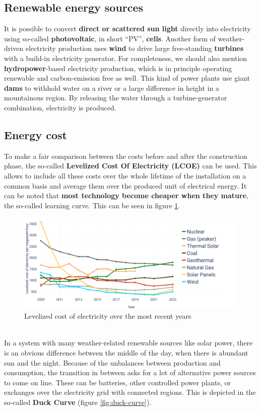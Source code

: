 \documentclass[../summary.tex]{subfiles}
\begin{document}
	\subsection{Renewable energy sources}
	
	It is possible to convert \textbf{direct or scattered sun light} directly into electricity using so-called \textbf{photovoltaic}, in short “PV”, \textbf{cells}. Another form of weather-driven electricity production uses \textbf{wind} to drive large free-standing \textbf{turbines} with a build-in electricity generator. For completeness, we should also mention \textbf{hydropower}-based electricity production, which is in principle operating renewable and carbon-emission free as well. This kind of power plants use giant \textbf{dams} to withhold water on a river or a large difference in height in a mountainous region. By releasing the water through a turbine-generator combination, electricity is produced.
	
	\subsection{Energy cost}
	
	To make a fair comparison between the costs before and after the construction phase, the so-called \textbf{Levelized Cost Of Electricity (LCOE)} can be used. This allows to include all these costs over the whole lifetime of the installation on a common basis and average them over the produced unit of electrical energy. It can be noted that \textbf{most technology become cheaper when they mature}, the so-called learning curve. This can be seen in figure \ref{fig:lcoe}.
	
	\begin{figure}[H]
		\centering
		\includegraphics[width=0.75\linewidth]{../images/4-LCOE}
		\caption{Levelized cost of electricity over the most recent years}
		\label{fig:lcoe}
	\end{figure}
	
	\ \\
	In a system with many weather-related renewable sources like solar power, there is an obvious difference between the middle of the day, when there is abundant sun and the night. Because of the unbalances between production and consumption, the transition in between asks for a lot of alternative power sources to come on line. These can be batteries, other controlled power plants, or exchanges over the electricity grid with connected regions. This is depicted in the so-called \textbf{Duck Curve} (figure \ref{fig:duck-curve}). 
	
\end{document}
